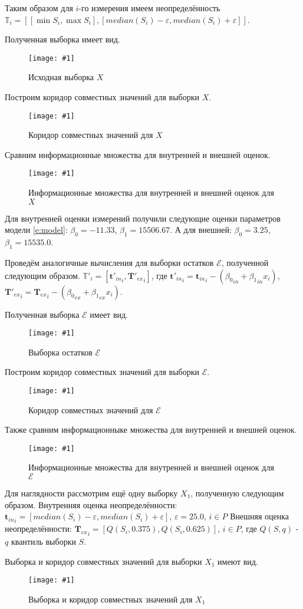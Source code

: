 \documentclass[a4paper,12pt]{article}
\newcommand{\plot}[3]{
    \begin{figure}[H]
        \begin{center}
            \texttt{[image: \#1]}
            \caption{#2}
            \label{#3}
        \end{center}
    \end{figure}
}
\begin{document}
    Таким образом для $ i $-го измерения имеем неопределённость \newline
    $ \mathbb{T}_i = [[\min{S_i}, \max{S_i}], [median(S_i) - \varepsilon, median(S_i) + \varepsilon]] $.

    Полученная выборка имеет вид.
    \plot{TwinSampleX}{Исходная выборка $ X $}{p:sampleX}

    Построим коридор совместных значений для выборки $ X $.
    \plot{TwinInformSetCorridorX}{Коридор совместных значений для $ X $}{p:informSetCorridorX}

    Сравним информационные множества для внутренней и внешней оценок.
    \plot{TwinInformSetX}{Информационные множества для внутренней и внешней оценок для $ X $}{p:informSetX}

    Для внутренней оценки измерений получили следующие оценки параметров модели \ref{e:model}:
    $ \beta_0 = -11.33 $, $ \beta_1 = 15506.67 $.
    А для внешней: $ \beta_0 = 3.25 $, $ \beta_1 = 15535.0 $. 

    Проведём аналогичные вычисления для выборки остатков $ \mathcal{E} $, полученной следующим образом.
    $ \mathbb{T}'_i = [{\textbf{t}'_{in}}_i, {\textbf{T}'_{ex}}_i] $,
    где $ {\textbf{t}'_{in}}_i = {\textbf{t}_{in}}_i - ({\beta_0}_{in} + {\beta_1}_{in} x_i) $,
    $ {\textbf{T}'_{ex}}_i = {\textbf{T}_{ex}}_i - ({\beta_0}_{ex} + {\beta_1}_{ex} x_i) $.

    Полученная выборка $ \mathcal{E} $ имеет вид.
    \plot{TwinSampleE}{Выборка остатков $ \mathcal{E} $}{p:sampleE}

    Построим коридор совместных значений для выборки $ \mathcal{E} $.
    \plot{TwinInformSetCorridorE}{Коридор совместных значений для $ \mathcal{E} $}{p:informSetCorridorE}

    Также сравним информационныке множества для внутренней и внешней оценок.
    \plot{TwinInformSetE}{Информационные множества для внутренней и внешней оценок для $ \mathcal{E} $}{p:InformSetE}

    Для наглядности рассмотрим ещё одну выборку $ X_1 $, полученную следующим образом.
    Внутренняя оценка неопределённости:
    $ {\textbf{t}_{in}}_i = [median(S_i) - \varepsilon, median(S_i) + \varepsilon] $, $ \varepsilon = 25.0 $, $ i \in P $
    Внешняя оценка неопределённости:
    $ {\textbf{T}_{ex}}_i = [Q(S_i, 0.375), Q(S_i, 0.625)] $, $ i \in P $, где $ Q(S, q) $ - $ q $ квантиль выборки $ S $.

    Выборка и коридор совместных значений для выборки $ X_1 $ имеют вид.
    \plot{TwinInformSEtCorridorX1}{Выборка и коридор совместных значений для $ X_1 $}{p:informSetCorridorX1}
\end{document}
